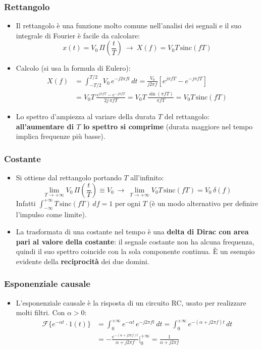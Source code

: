 \documentclass[12pt, a4paper]{article}
\begin{document}
\subsubsection{Rettangolo}
\begin{itemize}
    \item Il rettangolo è una funzione molto comune nell'analisi dei segnali e il suo integrale di Fourier è facile da calcolare:
    $$x(t)=V_0\,\Pi\!\left(\frac tT\right)\ \longrightarrow\ X(f)=V_0T\,\text{sinc}(fT)$$
    \item Calcolo (si usa la formula di Eulero):
    \begin{align*}
        X(f)&=\int_{-T/2}^{T/2}V_0\,e^{-j2\pi ft}\,dt=\frac{V_0}{j2\pi f}\left[e^{j\pi fT}-e^{-j\pi fT}\right]\\
        &=V_0T\,\frac{e^{j\pi fT}-e^{-j\pi fT}}{2j\,\pi fT}=V_0T\,\frac{\sin(\pi fT)}{\pi fT}=V_0T\,\text{sinc}(fT)
    \end{align*}
    \item Lo spettro d'ampiezza al variare della durata $T$ del rettangolo: \textbf{all'aumentare di $T$ lo spettro si comprime} (durata maggiore nel tempo implica frequenze più basse).
\end{itemize}

\subsubsection{Costante}
\begin{itemize}
    \item Si ottiene dal rettangolo portando $T$ all'infinito:
    $$\lim_{T\to+\infty}V_0\,\Pi\!\left(\frac tT\right)\equiv V_0\ \longrightarrow\ \lim_{T\to+\infty}V_0T\,\text{sinc}(fT)=V_0\,\delta(f)$$
    Infatti $\int_{-\infty}^{+\infty}T\,\text{sinc}(fT)\,df=1$ per ogni $T$ (è un modo alternativo per definire l'impulso come limite).
    \item La trasformata di una costante nel tempo è una \textbf{delta di Dirac con area pari al valore della costante}: il segnale costante non ha alcuna frequenza, quindi il suo spettro coincide con la sola componente continua. È un esempio evidente della \textbf{reciprocità} dei due domini.
\end{itemize}

\subsubsection{Esponenziale causale}
\begin{itemize}
    \item L'esponenziale causale è la risposta di un circuito RC, usato per realizzare molti filtri. Con $\alpha>0$:
    \begin{align*}
        \mathcal{F}\{e^{-\alpha t}\cdot1(t)\}&=\int_0^{+\infty}e^{-\alpha t}\,e^{-j2\pi ft}\,dt=\int_0^{+\infty}e^{-(\alpha+j2\pi f)t}\,dt\\
        &=-\frac{e^{-(\alpha+j2\pi f)t}}{\alpha+j2\pi f}\Bigg|_0^{+\infty}=\frac{1}{\alpha+j2\pi f}
    \end{align*}
\end{itemize}
\end{document}
